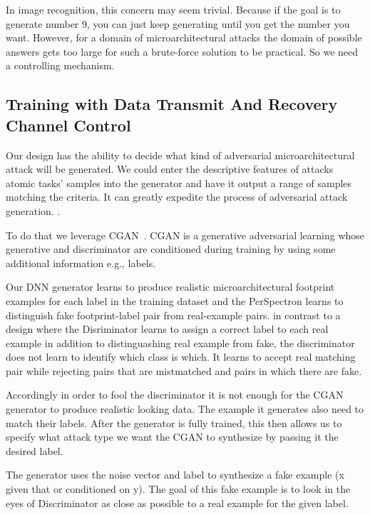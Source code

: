  In image recognition, this concern may seem trivial. Because if the goal is to generate number 9, you can just keep generating until you get the number you want. However, for a domain of microarchitectural attacks the domain of possible answers gets too large for such a brute-force solution to be practical. So we need a controlling mechanism.



 \subsection{Training with Data Transmit And Recovery Channel Control}
 
 
 Our design has the ability to decide what kind of adversarial microarchitectural attack will be generated. We could enter the descriptive features of attacks atomic tasks' samples into the generator and have it output a range of samples matching the criteria. It can greatly expedite the process of adversarial attack generation. . 
 
 To do that we leverage CGAN~\cite{cgan}. CGAN is a generative adversarial learning whose generative and discriminator are conditioned during training by using some additional information e.g., labels. 
 
 Our DNN generator learns to produce realistic microarchitectural footprint examples for each label in the training dataset and the PerSpectron learns to distinguish fake footprint-label pair from real-example pairs.   
 in contrast to a design where the Disriminator learns to assign a correct label to each real example in addition to distinguashing real example from fake, the discriminator does not learn to identify which class is which.  It learns to accept real matching pair while rejecting pairs that are mistmatched and pairs in which there are fake. 
 
 Accordingly in order to fool the discriminator it is not enough for the CGAN generator to produce realistic looking data. The example it generates also need to match their labels. After the generator is fully trained, this then allows us to specify what attack type we want the CGAN to synthesize by passing it the desired label. 
 
 The generator uses the noise vector and label to synthesize a fake example (x given that or conditioned on y). The goal of this fake example is to look in the eyes of Discriminator as close as possible to a real example for the given label.  
 
